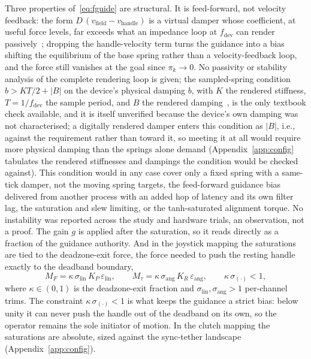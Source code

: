 \documentclass[12pt,a4paper,twoside,openright]{report}
\begin{document}
Three properties of~\eqref{eq:fguide} are structural. It is feed-forward, not velocity feedback: the form $D\,(v_{\text{field}} - v_{\text{handle}})$ is a virtual damper whose coefficient, at useful force levels, far exceeds what an impedance loop at $f_{\text{dev}}$ can render passively~\cite{colgate1994factors}; dropping the handle-velocity term turns the guidance into a bias shifting the equilibrium of the base spring rather than a velocity-feedback loop, and the force still vanishes at the goal since $\pi_k \to 0$. No passivity or stability analysis of the complete rendering loop is given; the sampled-spring condition $b > KT/2 + |B|$ on the device's physical damping $b$, with $K$ the rendered stiffness, $T = 1/f_{\text{dev}}$ the sample period, and $B$ the rendered damping~\cite{colgate1997schenkel}, is the only textbook check available, and it is itself unverified because the device's own damping was not characterised; a digitally rendered damper enters this condition as $|B|$, i.e., against the requirement rather than toward it, so meeting it at all would require more physical damping than the springs alone demand (Appendix~\ref{app:config} tabulates the rendered stiffnesses and dampings the condition would be checked against). This condition would in any case cover only a fixed spring with a same-tick damper, not the moving spring targets, the feed-forward guidance bias delivered from another process with an added hop of latency and its own filter lag, the saturation and slew limiting, or the tanh-saturated alignment torque. No instability was reported across the study and hardware trials, an observation, not a proof. The gain $g$ is applied after the saturation, so it reads directly as a fraction of the guidance authority. And in the joystick mapping the saturations are tied to the deadzone-exit force, the force needed to push the resting handle exactly to the deadband boundary,
\begin{equation}
M_F = \kappa\,\sigma_{\text{lin}}\, K_P\, \varepsilon_{\text{lin}},
\qquad
M_\tau = \kappa\,\sigma_{\text{ang}}\, K_R\, \varepsilon_{\text{ang}},
\qquad
\kappa\,\sigma_{(\cdot)} < 1,
\label{eq:kappacal}
\end{equation}
where $\kappa \in (0,1)$ is the deadzone-exit fraction and $\sigma_{\text{lin}}, \sigma_{\text{ang}} > 1$ per-channel trims. The constraint $\kappa\,\sigma_{(\cdot)} < 1$ is what keeps the guidance a strict bias: below unity it can never push the handle out of the deadband on its own, so the operator remains the sole initiator of motion. In the clutch mapping the saturations are absolute, sized against the sync-tether landscape (Appendix~\ref{app:config}).
\end{document}
